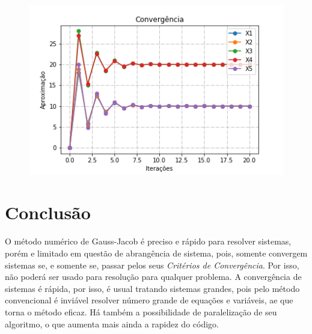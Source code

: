 \documentclass[
	12pt,				%
	openright,			%
	twoside,			%
	a4paper,			%
	english,			%
	french,				%
	spanish,			%
	brazil				%
	]{abntex2_new}
\begin{document}
\begin{alineas}
	\begin{figure}[htb]
		\includegraphics[scale=1]{grafico2.png}
	\end{figure}
\end{alineas}
 
\chapter{Conclusão}

O método numérico de Gauss-Jacob é preciso e rápido para resolver sistemas, porém e limitado
em questão de abrangência de sistema, pois, somente convergem sistemas se, e somente se, passar pelos seus \textit{Critérios de Convergência}. Por isso, não poderá ser usado
para resolução para qualquer problema. A convergência de sistemas é rápida, por isso, é usual
tratando sistemas grandes, pois pelo método convencional é inviável resolver número grande de equações
e variáveis, ae que torna o método eficaz. Há também a possibilidade de paralelização de seu algoritmo, o que aumenta mais ainda a rapidez do código.
 
 
\end{document}
